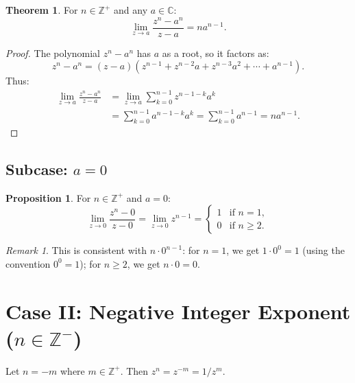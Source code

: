 \documentclass{article}
\theoremstyle{definition}
\newtheorem{theorem}{Theorem}[section]
\newtheorem{proposition}{Proposition}[section]
\theoremstyle{remark}
\newtheorem{remark}{Remark}[section]
\newcommand{\C}{\mathbb{C}}
\newcommand{\Z}{\mathbb{Z}}
\begin{document}
\begin{theorem}
For $n \in \Z^+$ and any $a \in \C$:
\begin{equation}
\lim_{z \to a} \frac{z^n - a^n}{z - a} = n a^{n-1}.
\end{equation}
\end{theorem}

\begin{proof}
The polynomial $z^n - a^n$ has $a$ as a root, so it factors as:
\begin{equation}
z^n - a^n = (z - a)(z^{n-1} + z^{n-2}a + z^{n-3}a^2 + \cdots + a^{n-1}).
\end{equation}
Thus:
\begin{align}
\lim_{z \to a} \frac{z^n - a^n}{z - a} &= \lim_{z \to a} \sum_{k=0}^{n-1} z^{n-1-k} a^k \\
&= \sum_{k=0}^{n-1} a^{n-1-k} a^k = \sum_{k=0}^{n-1} a^{n-1} = n a^{n-1}.
\end{align}
\end{proof}

\subsection{Subcase: $a = 0$}

\begin{proposition}
For $n \in \Z^+$ and $a = 0$:
\begin{equation}
\lim_{z \to 0} \frac{z^n - 0}{z - 0} = \lim_{z \to 0} z^{n-1} = 
\begin{cases}
1 & \text{if } n = 1, \\
0 & \text{if } n \geq 2.
\end{cases}
\end{equation}
\end{proposition}

\begin{remark}
This is consistent with $n \cdot 0^{n-1}$: for $n = 1$, we get $1 \cdot 0^0 = 1$ (using the convention $0^0 = 1$); for $n \geq 2$, we get $n \cdot 0 = 0$.
\end{remark}

\section{Case II: Negative Integer Exponent ($n \in \Z^-$)}

Let $n = -m$ where $m \in \Z^+$. Then $z^n = z^{-m} = 1/z^m$.
\end{document}

